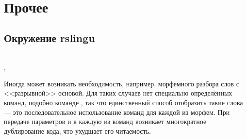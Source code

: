 \section{Прочее}

\subsection{Окружение rslingu}

\ExplSyntaxOn
\begin{tcolorbox}
    \rsModifier[env] \rsColon{}
    \rsCode{[\rsKwargs{}]}
    \\
    \rsTab{} \rsKwargs{} \rsColon{} , \rsSpace{} 
\end{tcolorbox}
\ExplSyntaxOff

Иногда может возникать необходимость, например, морфемного разбора слов с <<разрывной>> основой. Для таких случаев нет специально
определённых команд, подобно команде , так что единственный способ отобразить такие слова --- это
последовательное использование команд для каждой из морфем. При передаче параметров  и  в каждую из
команд возникает многократное дублирование кода, что ухудшает его читаемость.

